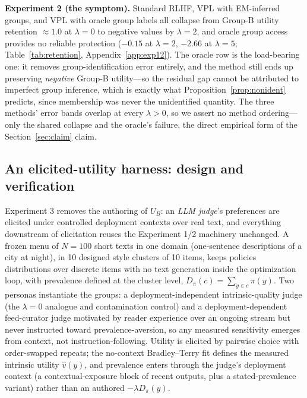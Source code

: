 ﻿\documentclass[11pt]{article}
\begin{document}
\textbf{Experiment 2 (the symptom).} Standard RLHF, VPL with EM-inferred groups, and VPL with oracle group labels \citep{poddar2024} all collapse from Group-B utility retention \(\approx 1.0\) at \(\lambda = 0\) to negative values by \(\lambda = 2\), and oracle group access provides no reliable protection (\(-0.15\) at \(\lambda = 2\), \(-2.66\) at \(\lambda = 5\); Table~\ref{tab:retention}, Appendix~\ref{app:exp12}). The oracle row is the load-bearing one: it removes group-identification error entirely, and the method still ends up preserving \emph{negative} Group-B utility---so the residual gap cannot be attributed to imperfect group inference, which is exactly what Proposition~\ref{prop:nonident} predicts, since membership was never the unidentified quantity. The three methods' error bands overlap at every \(\lambda > 0\), so we assert no method ordering---only the shared collapse and the oracle's failure, the direct empirical form of the Section~\ref{sec:claim} claim.

\subsection{An elicited-utility harness: design and verification}
\label{sec:harness}

Experiment 3 removes the authoring of \(U_B\): an \emph{LLM judge}'s preferences are elicited under controlled deployment contexts over real text, and everything downstream of elicitation reuses the Experiment 1/2 machinery unchanged. A frozen menu of \(N = 100\) short texts in one domain (one-sentence descriptions of a city at night), in 10 designed style clusters of 10 items, keeps policies distributions over discrete items with no text generation inside the optimization loop, with prevalence defined at the cluster level, \(D_\pi(c) = \sum_{y \in c}\pi(y)\). Two personas instantiate the groups: a deployment-independent intrinsic-quality judge (the \(\lambda = 0\) analogue and contamination control) and a deployment-dependent feed-curator judge motivated by reader experience over an ongoing stream but never instructed toward prevalence-aversion, so any measured sensitivity emerges from context, not instruction-following. Utility is elicited by pairwise choice with order-swapped repeats; the no-context Bradley--Terry fit defines the measured intrinsic utility \(\hat v(y)\), and prevalence enters through the judge's deployment context (a contextual-exposure block of recent outputs, plus a stated-prevalence variant) rather than an authored \(-\lambda D_\pi(y)\).
\end{document}
